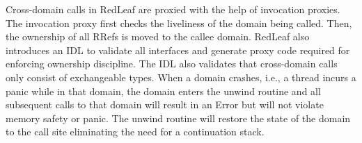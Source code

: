 Cross-domain calls in RedLeaf are proxied with the help of invocation proxies. The invocation proxy first checks the liveliness of the domain being called. Then, the ownership of all RRefs is moved to the callee domain. RedLeaf also introduces an IDL to validate all interfaces and generate proxy code required for enforcing ownership discipline. The IDL also validates that cross-domain calls only consist of exchangeable types. When a domain crashes, i.e., a thread incurs a panic while in that domain, the domain enters the unwind routine and all subsequent calls to that domain will result in an Error but will not violate memory safety or panic. The unwind routine will restore the state of the domain to the call site eliminating the need for a continuation stack.
